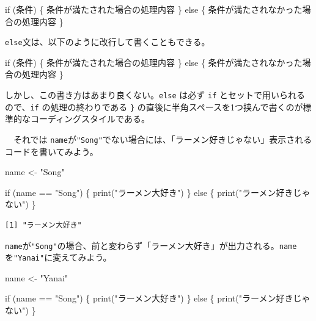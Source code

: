 \documentclass[
  a4paper,
  pandoc,
  ja=standard,
  jafont=haranoaji]{bxjsbook}
\newenvironment{Shaded}{\begin{snugshade}}{\end{snugshade}}
\newcommand{\ControlFlowTok}[1]{\textcolor[rgb]{0.00,0.48,0.65}{#1}}
\newcommand{\FunctionTok}[1]{\textcolor[rgb]{0.28,0.35,0.67}{#1}}
\newcommand{\NormalTok}[1]{\textcolor[rgb]{0.00,0.48,0.65}{#1}}
\newcommand{\OtherTok}[1]{\textcolor[rgb]{0.00,0.48,0.65}{#1}}
\newcommand{\SpecialCharTok}[1]{\textcolor[rgb]{0.37,0.37,0.37}{#1}}
\newcommand{\StringTok}[1]{\textcolor[rgb]{0.13,0.47,0.30}{#1}}
\begin{document}
\begin{Shaded}
\begin{Highlighting}[]
\ControlFlowTok{if}\NormalTok{ (条件) \{}
\NormalTok{  条件が満たされた場合の処理内容}
\NormalTok{\} }\ControlFlowTok{else}\NormalTok{ \{}
\NormalTok{  条件が満たされなかった場合の処理内容}
\NormalTok{\}}
\end{Highlighting}
\end{Shaded}

\texttt{else}文は、以下のように改行して書くこともできる。

\begin{Shaded}
\begin{Highlighting}[]
\ControlFlowTok{if}\NormalTok{ (条件) \{}
\NormalTok{  条件が満たされた場合の処理内容}
\NormalTok{\} }
\ControlFlowTok{else}\NormalTok{ \{}
\NormalTok{  条件が満たされなかった場合の処理内容}
\NormalTok{\}}
\end{Highlighting}
\end{Shaded}

しかし、この書き方はあまり良くない。\texttt{else} は必ず \texttt{if}
とセットで用いられるので、\texttt{if} の処理の終わりである \texttt{\}}
の直後に半角スペースを1つ挟んで書くのが標準的なコーディングスタイルである。

　それでは
\texttt{name}が\texttt{"Song"}でない場合には、「ラーメン好きじゃない」表示されるコードを書いてみよう。

\begin{Shaded}
\begin{Highlighting}[numbers=left,,]
\NormalTok{name }\OtherTok{\textless{}{-}} \StringTok{"Song"}

\ControlFlowTok{if}\NormalTok{ (name }\SpecialCharTok{==} \StringTok{"Song"}\NormalTok{) \{}
  \FunctionTok{print}\NormalTok{(}\StringTok{"ラーメン大好き"}\NormalTok{)}
\NormalTok{\} }\ControlFlowTok{else}\NormalTok{ \{}
  \FunctionTok{print}\NormalTok{(}\StringTok{"ラーメン好きじゃない"}\NormalTok{)}
\NormalTok{\}}
\end{Highlighting}
\end{Shaded}

\begin{verbatim}
[1] "ラーメン大好き"
\end{verbatim}

\texttt{name}が\texttt{"Song"}の場合、前と変わらず「ラーメン大好き」が出力される。\texttt{name}を\texttt{"Yanai"}に変えてみよう。

\begin{Shaded}
\begin{Highlighting}[numbers=left,,]
\NormalTok{name }\OtherTok{\textless{}{-}} \StringTok{"Yanai"}

\ControlFlowTok{if}\NormalTok{ (name }\SpecialCharTok{==} \StringTok{"Song"}\NormalTok{) \{}
  \FunctionTok{print}\NormalTok{(}\StringTok{"ラーメン大好き"}\NormalTok{)}
\NormalTok{\} }\ControlFlowTok{else}\NormalTok{ \{}
  \FunctionTok{print}\NormalTok{(}\StringTok{"ラーメン好きじゃない"}\NormalTok{)}
\NormalTok{\}}
\end{Highlighting}
\end{Shaded}
\end{document}
